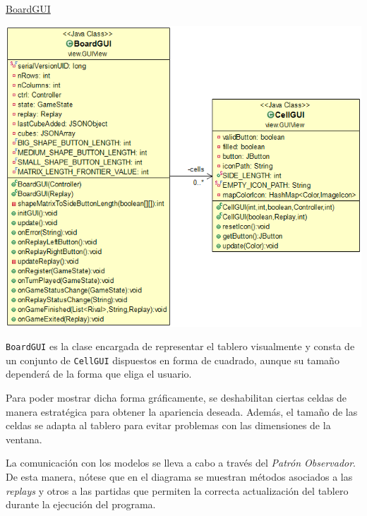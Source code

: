 \documentclass[12pt,a4paper,openright]{book}
\theoremstyle{break}
\begin{document}
\underline{BoardGUI}
\begin{center}
\includegraphics[scale=0.55]{boardgui-cellgui.png}
\end{center}

\texttt{BoardGUI} es la clase encargada de representar el tablero visualmente y consta de un conjunto de \texttt{CellGUI} dispuestos en forma de cuadrado, aunque su tamaño dependerá de la forma que eliga el usuario.

Para poder mostrar dicha forma gráficamente, se deshabilitan ciertas celdas de manera estratégica para obtener la apariencia deseada. Además, el tamaño de las celdas se adapta al tablero para evitar problemas con las dimensiones de la ventana.

La comunicación con los modelos se lleva a cabo a través del \textit{Patrón Observador}. De esta manera, nótese que en el diagrama se muestran métodos asociados a las \textit{replays} y otros a las partidas que permiten la correcta actualización del tablero durante la ejecución del programa.
\end{document}
